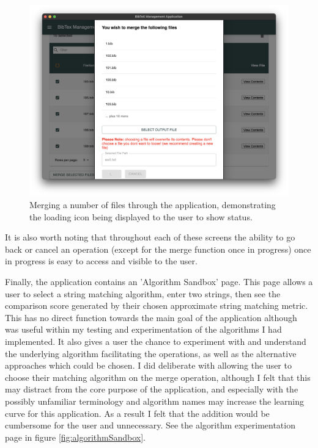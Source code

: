 \documentclass[a4paper,11pt]{article}
\begin{document}
\begin{figure}
    \centering
    \includegraphics[width=0.8\linewidth]{images/mergingFiles.png}
    \caption{Merging a number of files through the application, demonstrating the loading icon being displayed to the user to show status.}
    \label{fig:mergingFiles}
\end{figure}

It is also worth noting that throughout each of these screens the ability to go back or cancel an operation (except for the merge function once in progress) once in progress is easy to access and visible to the user.

Finally, the application contains an 'Algorithm Sandbox' page. This page allows a user to select a string matching algorithm, enter two strings, then see the comparison score generated by their chosen approximate string matching metric. This has no direct function towards the main goal of the application although was useful within my testing and experimentation of the algorithms I had implemented. It also gives a user the chance to experiment with and understand the underlying algorithm facilitating the operations, as well as the alternative approaches which could be chosen. I did deliberate with allowing the user to choose their matching algorithm on the merge operation, although I felt that this may distract from the core purpose of the application, and especially with the possibly unfamiliar terminology and algorithm names may increase the learning curve for this application. As a result I felt that the addition would be cumbersome for the user and unnecessary. See the algorithm experimentation page in figure \ref{fig:algorithmSandbox}.
\end{document}

